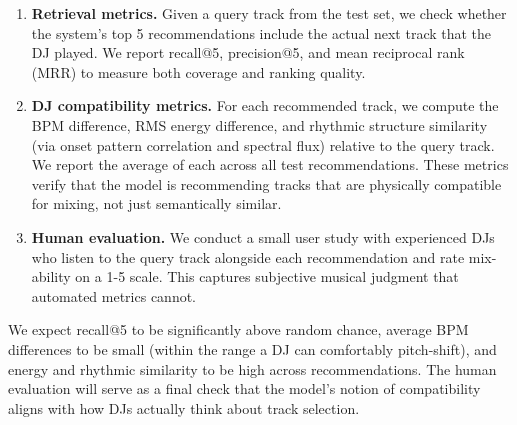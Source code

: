 \documentclass[10pt]{article}
\begin{document}
\begin{enumerate}
    \item \textbf{Retrieval metrics.} Given a query track from the test set, we check whether the system's top 5 recommendations include the actual next track that the DJ played. We report recall@5, precision@5, and mean reciprocal rank (MRR) to measure both coverage and ranking quality.

    \item \textbf{DJ compatibility metrics.} For each recommended track, we compute the BPM difference, RMS energy difference, and rhythmic structure similarity (via onset pattern correlation and spectral flux) relative to the query track. We report the average of each across all test recommendations. These metrics verify that the model is recommending tracks that are physically compatible for mixing, not just semantically similar.

    \item \textbf{Human evaluation.} We conduct a small user study with experienced DJs who listen to the query track alongside each recommendation and rate mix-ability on a 1-5 scale. This captures subjective musical judgment that automated metrics cannot.
\end{enumerate}

We expect recall@5 to be significantly above random chance, average BPM differences to be small (within the range a DJ can comfortably pitch-shift), and energy and rhythmic similarity to be high across recommendations. The human evaluation will serve as a final check that the model's notion of compatibility aligns with how DJs actually think about track selection.
\end{document}
